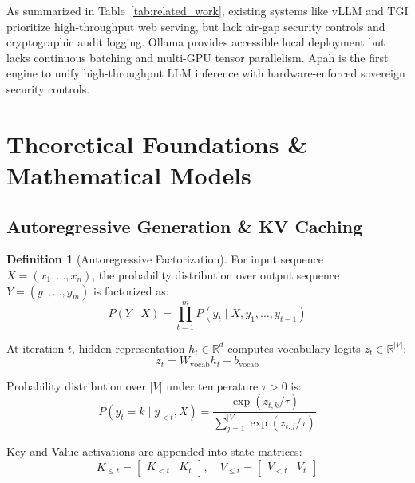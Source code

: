 \documentclass[10pt,twocolumn,a4paper]{article}
\theoremstyle{definition}
\newtheorem{definition}{Definition}[section]
\theoremstyle{remark}
\begin{document}
As summarized in Table~\ref{tab:related_work}, existing systems like vLLM and TGI prioritize high-throughput web serving, but lack air-gap security controls and cryptographic audit logging. Ollama provides accessible local deployment but lacks continuous batching and multi-GPU tensor parallelism. Apah is the first engine to unify high-throughput LLM inference with hardware-enforced sovereign security controls.

\section{Theoretical Foundations \& Mathematical Models}
\label{sec:math}

\subsection{Autoregressive Generation \& KV Caching}

\begin{definition}[Autoregressive Factorization]
For input sequence $X = (x_1, \dots, x_n)$, the probability distribution over output sequence $Y = (y_1, \dots, y_m)$ is factorized as:
\begin{equation}
P(Y \mid X) = \prod_{t=1}^{m} P(y_t \mid X, y_1, \dots, y_{t-1})
\end{equation}
\end{definition}

At iteration $t$, hidden representation $h_t \in \mathbb{R}^d$ computes vocabulary logits $z_t \in \mathbb{R}^{|V|}$:
\begin{equation}
z_t = W_{\text{vocab}} h_t + b_{\text{vocab}}
\end{equation}

Probability distribution over $|V|$ under temperature $\tau > 0$ is:
\begin{equation}
P(y_t = k \mid y_{<t}, X) = \frac{\exp\left(z_{t,k} / \tau\right)}{\sum_{j=1}^{|V|} \exp\left(z_{t,j} / \tau\right)}
\end{equation}

Key and Value activations are appended into state matrices:
\begin{equation}
K_{\le t} = \begin{bmatrix} K_{<t} & K_t \end{bmatrix}, \quad V_{\le t} = \begin{bmatrix} V_{<t} & V_t \end{bmatrix}
\end{equation}
\end{document}
